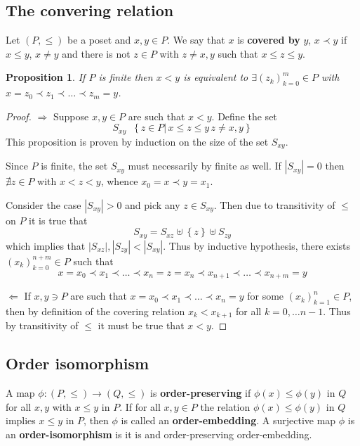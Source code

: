 \documentclass[a4paper]{article}
\newcommand{\obj}[1]{{\left\{ #1 \right \}}}
\newcommand{\brac}[1]{{\left ( #1 \right )}}
\newcommand{\induc}[1]{{\left . #1 \right \vert}}
\newcommand{\abs}[1]{{\left | #1 \right |}}
\newtheorem{prop}{Proposition}
\newcommand{\defn}{\mathop{\overset{\Delta}{=}}\nolimits}
\begin{document}
\subsection{The convering relation} %
\label{sub:the_convering_relation}

Let $(P,\leq)$ be a poset and $x, y\in P$. We say that $x$ is \textbf{covered by} $y$, $x\prec y$ if $x\leq y$, $x\neq y$ and there is not $z\in P$ with $z\neq x, y$ such that $x \leq z \leq y$.

\begin{prop} If $P$ is finite then $x<y$ is equivalent to $\exists \brac{z_k}_{k=0}^m\in P$ with $x = z_0\prec z_1\prec \ldots \prec z_m = y$.
\end{prop}

\begin{proof}
$\Rightarrow$ Suppose $x,y\in P$ are such that $x<y$. Define the set \[S_{xy}\defn \obj{\induc{z\in P}\,x \leq z \leq y\,z\neq x,y}\] This proposition is proven by induction on the size of the set $S_{xy}$.

Since $P$ is finite, the set $S_{xy}$ must necessarily by finite as well. If $\abs{S_{xy}} = 0$ then $\nexists z\in P$ with $x<z<y$, whence $x_0 = x\prec y = x_1$.

Consider the case $\abs{S_{xy}}>0$ and pick any $z\in S_{xy}$. Then due to transitivity of $\leq$ on $P$ it is true that \[S_{xy} = S_{xz}\uplus \obj{z}\uplus S_{zy}\] which implies that $\abs{S_{xz}},\abs{S_{zy}}<\abs{S_{xy}}$. Thus by inductive hypothesis, there exists $\brac{x_k}_{k=0}^{n+m}\in P$ such that \[x = x_0 \prec x_1 \prec \ldots \prec x_n = z = x_n \prec x_{n+1} \prec \ldots \prec x_{n+m} = y\]

$\Leftarrow$ If $x,y\ni P$ are such that $x = x_0 \prec x_1 \prec \ldots \prec x_n = y$ for some $\brac{x_k}_{k=1}^n\in P$, then by definition of the covering relation $x_k<x_{k+1}$ for all $k=0,\ldots {n-1}$. Thus by transitivity of $\leq$ it must be true that $x<y$.

\end{proof}


\subsection{Order isomorphism} %
\label{sub:order_isomorphism}

A map $\phi:(P,\leq)\to (Q,\leq)$ is \textbf{order-preserving} if $\phi(x)\leq \phi(y)$ in $Q$ for all $x,y$ with $x\leq y$ in $P$. If for all $x,y\in P$ the relation $\phi(x)\leq \phi(y)$ in $Q$ implies $x\leq y$ in $P$, then $\phi$ is called an \textbf{order-embedding}. A surjective map $\phi$ is an \textbf{order-isomorphism} is it is and order-preserving order-embedding.
\end{document}
